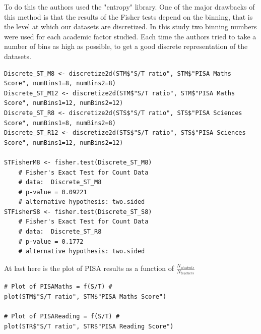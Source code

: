 \documentclass[12pt,a4paper]{article}
\begin{document}
To do this the authors used the "entropy" library. One of the major drawbacks of this method is that the results of the Fisher tests depend on the binning, that is the level at which our datasets are discretized.
In this study two binning numbers were used for each academic factor studied. Each time the authors tried to take a number of bins as high as possible, to get a good discrete representation of the datasets.
\begin{lstlisting}
Discrete_ST_M8 <- discretize2d(STM$"S/T ratio", STM$"PISA Maths Score", numBins1=8, numBins2=8)
Discrete_ST_M12 <- discretize2d(STM$"S/T ratio", STM$"PISA Maths Score", numBins1=12, numBins2=12)
Discrete_ST_R8 <- discretize2d(STS$"S/T ratio", STS$"PISA Sciences Score", numBins1=8, numBins2=8)
Discrete_ST_R12 <- discretize2d(STS$"S/T ratio", STS$"PISA Sciences Score", numBins1=12, numBins2=12)

STFisherM8 <- fisher.test(Discrete_ST_M8)
	# Fisher's Exact Test for Count Data
	# data:  Discrete_ST_M8
	# p-value = 0.09221
	# alternative hypothesis: two.sided
STFisherS8 <- fisher.test(Discrete_ST_S8)
	# Fisher's Exact Test for Count Data
	# data:  Discrete_ST_R8
	# p-value = 0.1772
	# alternative hypothesis: two.sided
\end{lstlisting}
At last here is the plot of PISA results as a function of $\frac{N_{students}}{N_{teachers}}$
\begin{lstlisting}	
# Plot of PISAMaths = f(S/T) #
plot(STM$"S/T ratio", STM$"PISA Maths Score")

# Plot of PISAReading = f(S/T) #
plot(STR$"S/T ratio", STR$"PISA Reading Score")
\end{lstlisting}
\end{document}
